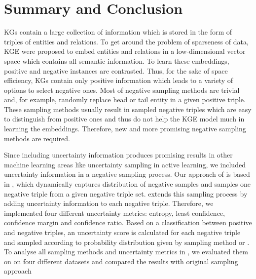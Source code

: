 \section{Summary and Conclusion}  
\label{sec:summary_and_conclusion}

\acp{KG} contain a large collection of information which is stored in the form of triples of entities and relations.
To get around the problem of sparseness of data, \ac{KGE} were proposed to embed entities and relations in a low-dimensional vector space which contains all semantic information.
To learn these embeddings, positive and negative instances are contrasted.
Thus, for the sake of space efficiency, \acp{KG} contain only positive information which leads to a variety of options to select negative ones.
Most of negative sampling methods are trivial and, for example, randomly replace head or tail entity in a given positive triple.
These sampling methods usually result in sampled negative triples which are easy to distinguish from positive ones and thus do not help the \ac{KGE} model much in learning the embeddings. 
Therefore, new and more promising negative sampling methods are required.

Since including uncertainty information produces promising results in other machine learning areas like uncertainty sampling in active learning, we included uncertainty information in a negative sampling process.
Our approach of \ucgan is based in \kbgan, which dynamically captures distribution of negative samples and samples one negative triple from a given negative triple set.
\ucgan extends this sampling process by adding uncertainty information to each negative triple.
Therefore, we implemented four different uncertainty metrics: entropy, least confidence, confidence margin and confidence ratio.
Based on a classification between positive and negative triples, an uncertainty score is calculated for each negative triple and sampled according to probability distribution given by sampling method \ussoftmax or \usmax.
To analyse all sampling methods and uncertainty metrics in \ucgan, we evaluated them on on four different datasets and compared the results with original \kbgan sampling approach 


